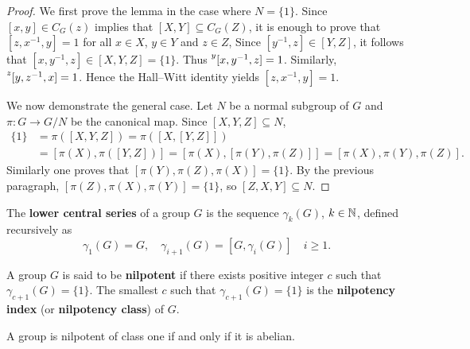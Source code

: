 \begin{proof}
	We first prove the lemma in the case where $N=\{1\}$. 	Since $[x,y]\in C_G(z)$ implies that 
	$[X,Y]\subseteq C_G(Z)$, it
	is enough to prove that $[z,x^{-1},y]=1$ for all $x\in X$, $y\in Y$ and $z\in Z$, 
	Since $[y^{-1},z]\in [Y,Z]$, it follows that 
	$[x,y^{-1},z]\in [X,Y,Z]=\{1\}$. Thus $\prescript{y}{}[x,y^{-1},z]=1$.
	Similarly, $\prescript{z}{}[y,z^{-1},x]=1$. Hence the 
	Hall--Witt identity yields 
	$[z,x^{-1},y]=1$.

	We now demonstrate the general case. Let $N$ be a normal subgroup of $G$ 
	and $\pi\colon G\to G/N$ be the canonical map. Since $[X,Y,Z]\subseteq N$, 
	\begin{align*}
		\{1\}&=\pi([X,Y,Z])=\pi([ X,[Y,Z]])\\
		&=[\pi(X),\pi([Y,Z])]=[ \pi(X),[\pi(Y),\pi(Z)]]=[\pi(X),\pi(Y),\pi(Z)]. 
	\end{align*}
	Similarly one proves that $[\pi(Y),\pi(Z),\pi(X)]=\{1\}$. By the previous paragraph,  
	$[\pi(Z),\pi(X),\pi(Y)]=\{1\}$, so $[Z,X,Y]\subseteq N$.
\end{proof}

The \textbf{lower central series} of a group $G$ is 
the sequence $\gamma_k(G)$, $k\in\mathbb{N}$, 
defined recursively as 
\[
		\gamma_1(G)=G,\quad
		\gamma_{i+1}(G)=[G,\gamma_i(G)]\quad i\geq 1.
\]

A group $G$ is said to be \textbf{nilpotent} if there exists positive integer $c$ such that 
$\gamma_{c+1}(G)=\{1\}$. The smallest $c$ such that $\gamma_{c+1}(G)=\{1\}$ is
the \textbf{nilpotency index} (or \textbf{nilpotency class}) of $G$. 


\begin{example}
	A group is nilpotent of class one if and only if it is abelian.  
\end{example}


